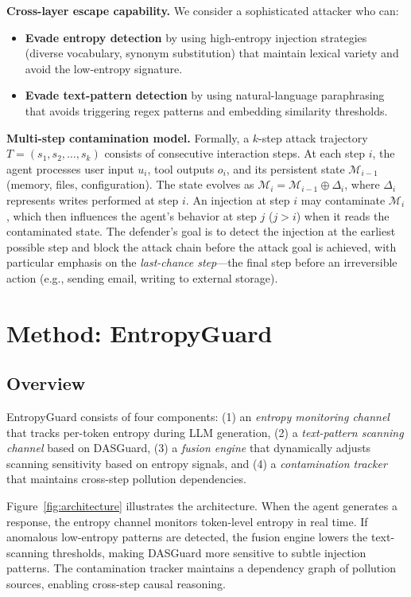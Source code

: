 \documentclass[conference]{IEEEtran}
\begin{document}
\textbf{Cross-layer escape capability.} We consider a sophisticated attacker who can:
\begin{itemize}
    \item \textbf{Evade entropy detection} by using high-entropy injection strategies (diverse vocabulary, synonym substitution) that maintain lexical variety and avoid the low-entropy signature.
    \item \textbf{Evade text-pattern detection} by using natural-language paraphrasing that avoids triggering regex patterns and embedding similarity thresholds.
\end{itemize}

\textbf{Multi-step contamination model.} Formally, a $k$-step attack trajectory $T = (s_1, s_2, \ldots, s_k)$ consists of consecutive interaction steps. At each step $i$, the agent processes user input $u_i$, tool outputs $o_i$, and its persistent state $\mathcal{M}_{i-1}$ (memory, files, configuration). The state evolves as $\mathcal{M}_i = \mathcal{M}_{i-1} \oplus \Delta_i$, where $\Delta_i$ represents writes performed at step $i$. An injection at step $i$ may contaminate $\mathcal{M}_i$, which then influences the agent's behavior at step $j$ ($j > i$) when it reads the contaminated state. The defender's goal is to detect the injection at the earliest possible step and block the attack chain before the attack goal is achieved, with particular emphasis on the \emph{last-chance step}---the final step before an irreversible action (e.g., sending email, writing to external storage).

\section{Method: EntropyGuard}
\label{sec:method}

\subsection{Overview}

EntropyGuard consists of four components: (1) an \emph{entropy monitoring channel} that tracks per-token entropy during LLM generation, (2) a \emph{text-pattern scanning channel} based on DASGuard, (3) a \emph{fusion engine} that dynamically adjusts scanning sensitivity based on entropy signals, and (4) a \emph{contamination tracker} that maintains cross-step pollution dependencies.

Figure~\ref{fig:architecture} illustrates the architecture. When the agent generates a response, the entropy channel monitors token-level entropy in real time. If anomalous low-entropy patterns are detected, the fusion engine lowers the text-scanning thresholds, making DASGuard more sensitive to subtle injection patterns. The contamination tracker maintains a dependency graph of pollution sources, enabling cross-step causal reasoning.
\end{document}
